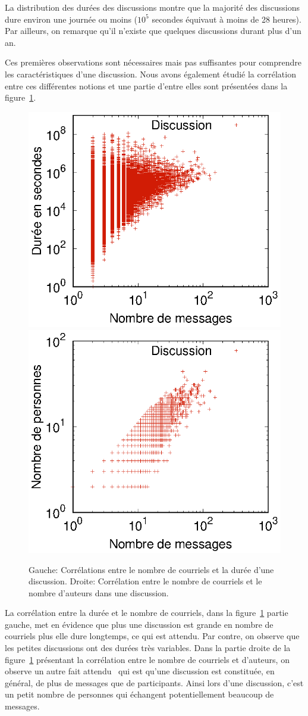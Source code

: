La distribution des durées des discussions montre que la majorité des discussions dure environ une journée ou moins ($10^5$ secondes équivaut à moins de 28 heures).
Par ailleurs, on remarque qu'il n'existe que quelques discussions durant plus d'un an.

Ces premières observations sont nécessaires mais pas suffisantes pour comprendre les caractéristiques d'une discussion.
Nous avons également étudié la corrélation entre ces différentes notions et une partie d'entre elles sont présentées dans la figure~\ref{fig:corr_discussion}.


\begin{figure}
	\centering
	\includegraphics[width=0.4\linewidth]{img/mailing/sizes-durations-corr.eps}
	\includegraphics[width=0.4\linewidth]{img/mailing/sizes-authors-corr.eps}
	\caption{Gauche: Corrélations entre le nombre de courriels et la durée d'une discussion. Droite: Corrélation entre le nombre de courriels et le nombre d'auteurs dans une discussion.}
	\label{fig:corr_discussion}
\end{figure}

La corrélation entre la durée et le nombre de courriels, dans la figure~\ref{fig:corr_discussion} partie gauche, met en évidence que plus une discussion est grande en nombre de courriels plus elle dure longtemps, ce qui est attendu.
Par contre, on observe que les petites discussions ont des durées très variables. 
Dans la partie droite de la figure~\ref{fig:corr_discussion} présentant la corrélation entre le nombre de courriels et d'auteurs, on observe un autre fait attendu~\cite{dorat2007} qui est qu'une discussion est constituée, en général, de plus de messages que de participants.
Ainsi lors d'une discussion, c'est un petit nombre de personnes qui échangent potentiellement beaucoup de messages. 

